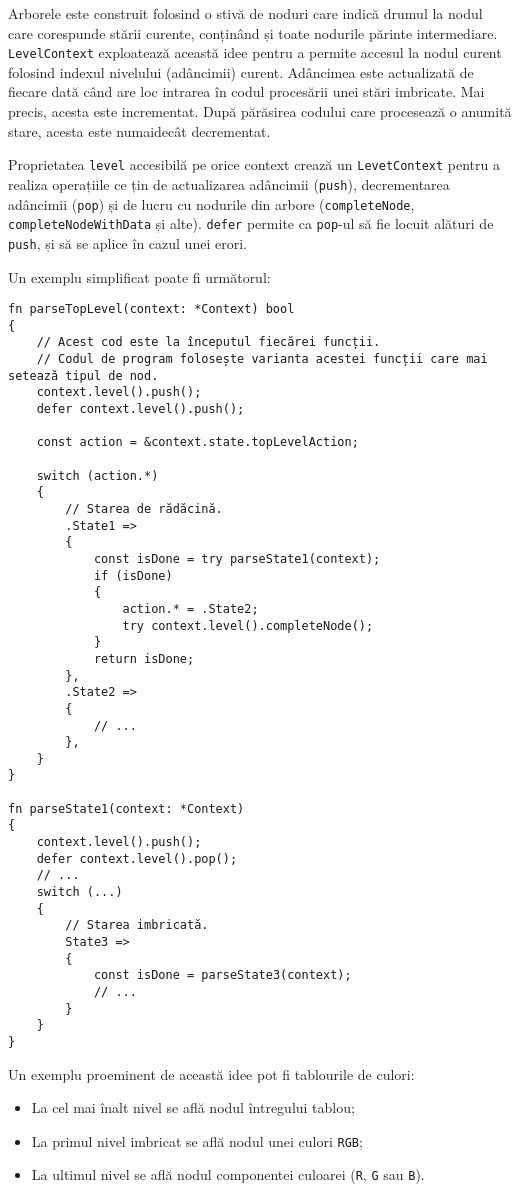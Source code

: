 \documentclass[a4paper,12pt]{report}
\begin{document}
Arborele este construit folosind o stivă de noduri care
indică drumul la nodul care corespunde stării curente,
conținând și toate nodurile părinte intermediare.
\texttt{LevelContext} exploatează această idee pentru a permite accesul la
nodul curent folosind indexul nivelului (adâncimii) curent.
Adâncimea este actualizată de fiecare dată când are loc intrarea în codul procesării unei stări imbricate.
Mai precis, acesta este incrementat.
După părăsirea codului care procesează o anumită stare, acesta este numaidecât decrementat.

Proprietatea \texttt{level} accesibilă pe orice context crează un \texttt{LevetContext}
pentru a realiza operațiile ce țin de actualizarea adâncimii (\texttt{push}),
decrementarea adâncimii (\texttt{pop}) și de lucru cu nodurile
din arbore (\texttt{completeNode}, \texttt{completeNodeWithData} și alte).
\texttt{defer} permite ca \texttt{pop}-ul să fie locuit alături de \texttt{push},
și să se aplice în cazul unei erori. 

Un exemplu simplificat poate fi următorul:

\begin{verbatim}
fn parseTopLevel(context: *Context) bool
{
    // Acest cod este la începutul fiecărei funcții.
    // Codul de program folosește varianta acestei funcții care mai setează tipul de nod.
    context.level().push();
    defer context.level().push();

    const action = &context.state.topLevelAction;

    switch (action.*)
    {
        // Starea de rădăcină.
        .State1 =>
        {
            const isDone = try parseState1(context);
            if (isDone)
            {
                action.* = .State2;
                try context.level().completeNode();
            }
            return isDone;
        },
        .State2 =>
        {
            // ...
        },
    }
}

fn parseState1(context: *Context)
{
    context.level().push();
    defer context.level().pop();
    // ...
    switch (...)
    {
        // Starea imbricată.
        State3 =>
        {
            const isDone = parseState3(context);
            // ...
        }
    }
}
\end{verbatim}

Un exemplu proeminent de această idee pot fi tablourile de culori:
\begin{itemize}
    \item La cel mai înalt nivel se află nodul întregului tablou;
    \item La primul nivel imbricat se află nodul unei culori \texttt{\ac{RGB}};
    \item La ultimul nivel se află nodul componentei culoarei (\texttt{R}, \texttt{G} sau \texttt{B}).
\end{itemize}
\end{document}
